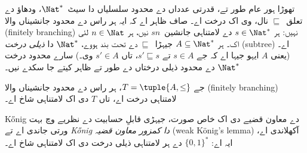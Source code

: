 \documentclass[../../../include/open-logic-section]{subfiles}
\begin{document}
\begin{ex}
تھوڑا ہور عام طور تے، قدرتی عدداں دے محدود سلسلیاں دا سیٹ~$\Nat^*$،
ودھاؤ دے تعلق~$\sqsubseteq$ نال، وی اک درخت اے۔ صاف ظاہر اے کہ ایہ ہر
راس دے محدود جانشیناں والا (finitely branching) نہیں: ہر $s \in \Nat^*$ دے لامتناہی
جانشین~$sn$ نیں، ہر $n \in \Nat$ لئی اک۔ ہر $A \subseteq \Nat^*$
جیہڑا~$\sqsubseteq$ دے تحت بند ہووے، $\Nat^*$ دا \emph{ذیلی درخت}
(subtree) اے۔
(یعنی $A$ ایہو جیہا اے کہ جے $s \in A$ تے $s' \sqsubseteq s$، تاں
$s' \in A$ وی۔) سارے محدود درخت $\Nat^*$ دے محدود ذیلی درختاں دے طور
تے ظاہر کیتے جا سکدے نیں۔
\end{ex}

\begin{prop}
جے $T = \tuple{A,\le}$، ہر راس دے محدود جانشیناں والا (finitely
branching) لامتناہی درخت اے،
تاں $T$ دی اک لامتناہی شاخ اے۔
\end{prop}

K\H{o}nig دے معاون قضیے دی اک خاص صورت، جیہڑی قابلِ حسابیت دے نظریے
وچ بہت ورتی جاندی اے تے \emph{K\H{o}nig دا کمزور معاون قضیہ} (weak
König's lemma) آکھلاندی اے، ایہ اے: $\{0,1\}^*$ دے ہر لامتناہی ذیلی
درخت دی اک لامتناہی شاخ اے۔
\end{document}
